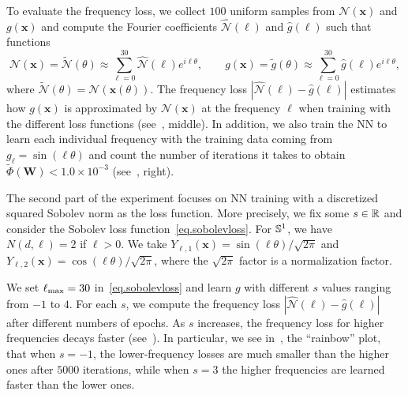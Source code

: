 To evaluate the frequency loss, we collect $100$ uniform samples from $\mathcal{N}(\mathbf{x})$ and $g(\mathbf{x})$ and compute the Fourier coefficients $\widehat{\mathcal N}(\ell)$ and $\hat{g}(\ell)$ such that functions%
\begin{equation*}
  \mathcal{N}(\mathbf{x}) =   \widetilde{\mathcal{N}} (\theta) \approx \sum_{\ell=0}^{30} \widehat{\mathcal N}(\ell) e^{i\ell\theta}, \qquad   g(\mathbf{x}) =   \tilde{g} (\theta) \approx \sum_{\ell=0}^{30} \hat{g}(\ell) e^{i\ell\theta},
\end{equation*}
where $\widetilde{\mathcal{N}}(\theta) = \mathcal{N}(\mathbf{x}(\theta))$.
The frequency loss $|\widehat{\mathcal N}(\ell)-\hat{g}(\ell)|$ estimates how $g(\mathbf{x})$ is approximated by $\mathcal{N}(\mathbf{x})$ at the frequency $\ell$ when training with the different loss functions (see~, middle). In addition, we also train the NN to learn each individual frequency with the training data coming from $g_\ell = \sin(\ell\theta)$ and count the number of iterations it takes to obtain $\widetilde \Phi(\mathbf{W}) < 1.0 \times 10^{-3}$ (see~, right).

The second part of the experiment focuses on NN training with a discretized squared Sobolev norm as the loss function. More precisely, we fix some $s \in \mathbb{R}$ and consider the Sobolev loss function~\cref{eq.sobolevloss}.
For ${\mathbb{S}}^1$, we have $N(d,\ell) = 2$ if $\ell > 0$. We take $Y_{\ell,1}(\mathbf{x}) = \sin(\ell\theta)/\sqrt{2\pi}$ and $Y_{\ell,2}(\mathbf{x}) = \cos(\ell\theta)/\sqrt{2\pi}$, where the $\sqrt{2\pi}$ factor is a normalization factor. %

We set $\ell_{\text{max}}= 30$ in~\cref{eq.sobolevloss} and learn $g$ with different $s$ values ranging from $-1$ to $4$. For each $s$, we compute the frequency loss $|\widehat{\mathcal N}(\ell)-\hat{g}(\ell)|$  after
different numbers of epochs. As $s$ increases, the frequency loss for higher frequencies decays faster (see~). In particular, we see in~, the ``rainbow'' plot, that when $s = -1$, the lower-frequency losses are much smaller than the higher ones after $5000$ iterations, while when $s = 3$
the higher frequencies are learned faster than the lower ones. 



